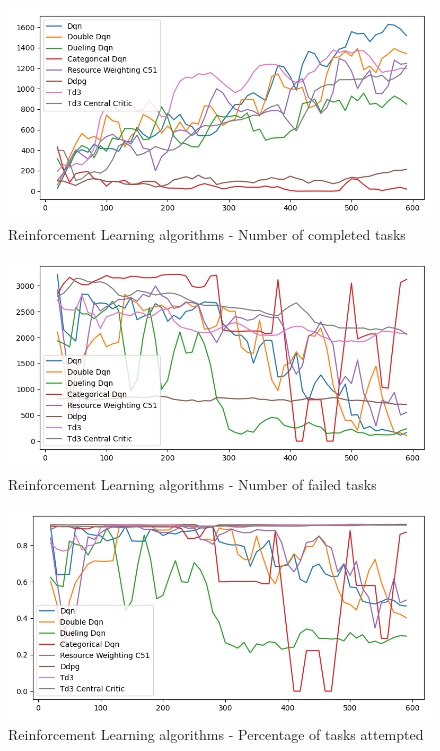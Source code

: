 \begin{figure}[H]
    \centering
    \includegraphics[width=\linewidth]{figures/5_evaluation_figs/algo_training_fig/num_completed_tasks.png}
    \caption{Reinforcement Learning algorithms - Number of completed tasks}
    \label{fig:algo-num-completed_tasks}
\end{figure}

\begin{figure}[H]
    \centering
    \includegraphics[width=\linewidth]{figures/5_evaluation_figs/algo_training_fig/num_failed_tasks.png}
    \caption{Reinforcement Learning algorithms - Number of failed tasks}
    \label{fig:algo-num-failed-tasks}
\end{figure}

\begin{figure}[H]
    \centering
    \includegraphics[width=\linewidth]{figures/5_evaluation_figs/algo_training_fig/percent_tasks.png}
    \caption{Reinforcement Learning algorithms - Percentage of tasks attempted}
    \label{fig:algo-percent-tasks}
\end{figure}

